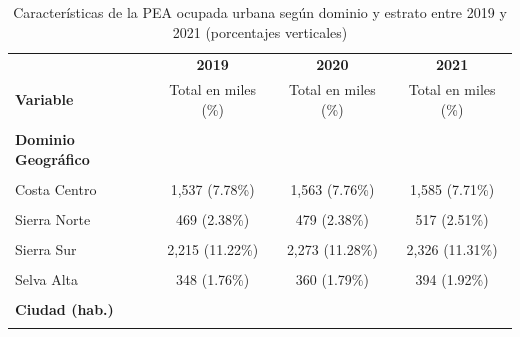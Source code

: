 \documentclass[
  letterpaper,
  12pt,
  oneside,
  spanish,
  doublespacing,
  headsepline,
  parskip]{MastersDoctoralThesis}
\begin{document}
\hypertarget{tbl-peadomes}{}
\begin{table}[H]
\caption{\label{tbl-peadomes}Características de la PEA ocupada urbana según dominio y estrato entre
2019 y 2021 (porcentajes verticales) }\tabularnewline

\centering\begingroup\fontsize{10}{12}\selectfont

\begin{tabular}{lccc}
\toprule
\multicolumn{1}{c}{ } & \multicolumn{1}{c}{\textbf{2019}} & \multicolumn{1}{c}{\textbf{2020}} & \multicolumn{1}{c}{\textbf{2021}} \\
\cmidrule(l{3pt}r{3pt}){2-2} \cmidrule(l{3pt}r{3pt}){3-3} \cmidrule(l{3pt}r{3pt}){4-4}
\textbf{Variable} & Total en miles (\%) & Total en miles (\%) & Total en miles (\%)\\
\midrule
\cellcolor{gray!6}{\textbf{Nacional}} & \cellcolor{gray!6}{19,747 (100.00\%)} & \cellcolor{gray!6}{20,153 (100.00\%)} & \cellcolor{gray!6}{20,558 (100.00\%)}\\
\textbf{Dominio Geográfico} &  &  & \\
\cellcolor{gray!6}{Costa Norte} & \cellcolor{gray!6}{3,285 (16.64\%)} & \cellcolor{gray!6}{3,349 (16.62\%)} & \cellcolor{gray!6}{3,406 (16.57\%)}\\
Costa Centro & 1,537 (7.78\%) & 1,563 (7.76\%) & 1,585 (7.71\%)\\
\cellcolor{gray!6}{Costa Sur} & \cellcolor{gray!6}{466 (2.36\%)} & \cellcolor{gray!6}{468 (2.32\%)} & \cellcolor{gray!6}{481 (2.34\%)}\\
\addlinespace
Sierra Norte & 469 (2.38\%) & 479 (2.38\%) & 517 (2.51\%)\\
\cellcolor{gray!6}{Sierra Centro} & \cellcolor{gray!6}{1,497 (7.58\%)} & \cellcolor{gray!6}{1,531 (7.59\%)} & \cellcolor{gray!6}{1,554 (7.56\%)}\\
Sierra Sur & 2,215 (11.22\%) & 2,273 (11.28\%) & 2,326 (11.31\%)\\
\cellcolor{gray!6}{Selva Baja} & \cellcolor{gray!6}{1,613 (8.17\%)} & \cellcolor{gray!6}{1,663 (8.25\%)} & \cellcolor{gray!6}{1,653 (8.04\%)}\\
Selva Alta & 348 (1.76\%) & 360 (1.79\%) & 394 (1.92\%)\\
\addlinespace
\cellcolor{gray!6}{Lima Metropolitana} & \cellcolor{gray!6}{8,317 (42.12\%)} & \cellcolor{gray!6}{8,467 (42.01\%)} & \cellcolor{gray!6}{8,641 (42.03\%)}\\
\textbf{Ciudad (hab.)} &  &  & \\
\cellcolor{gray!6}{500 000 a más} & \cellcolor{gray!6}{9,718 (49.21\%)} & \cellcolor{gray!6}{9,926 (49.25\%)} & \cellcolor{gray!6}{10,259 (49.90\%)}\\

\end{tabular}
\end{table}
\end{document}
